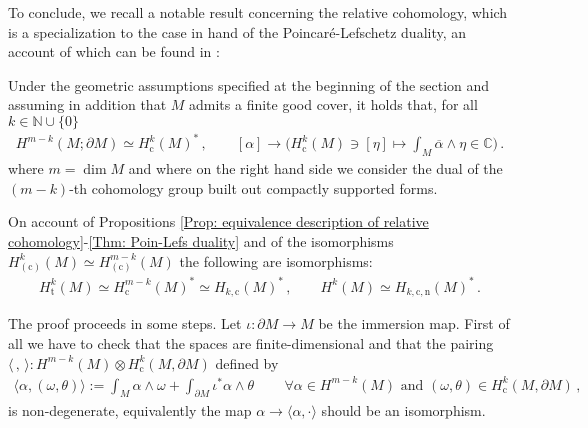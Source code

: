\noindent To conclude, we recall a notable result concerning the relative cohomology, which is a specialization to the case in hand of the Poincar\'e-Lefschetz duality, an account of which can be found in \cite{Maunder}:

\begin{theore}\label{Thm: Poin-Lefs duality}
	Under the geometric assumptions specified at the beginning of the section and assuming in addition that $M$ admits a finite good cover, it holds that, for all $k\in\mathbb{N}\cup\{0\}$
	\begin{align}
	H^{m-k}(M;\partial M)\simeq H^k_{\mathrm{c}}(M)^*\,,\qquad
	[\alpha]\to\bigg(H^k_{\mathrm{c}}(M)\ni[\eta]\mapsto\int_M\overline{\alpha}\wedge\eta\in\mathbb{C}\bigg)\,.
	\end{align}
	where $m=\dim M$ and where on the right hand side we consider the dual of the $(m-k)$-th cohomology group built out compactly supported forms.
\end{theore}

\begin{remar}\label{Rmk: consequence of Poincare--Lefschetz duality}
	On account of Propositions \ref{Prop: equivalence description of relative cohomology}-\ref{Thm: Poin-Lefs duality} and of the isomorphisms $H^k_{(\mathrm{c})}(M)\simeq H^{m-k}_{(\mathrm{c})}(M)$ the following are isomorphisms:
	\begin{align}\label{Eqn: relative cohomology isomorphic to dual of compactly supported differential homology }
	H^k_{\mathrm{t}}(M)\simeq
	H^{m-k}_{\mathrm{c}}(M)^*\simeq
	H_{k,\mathrm{c}}(M)^*\,,\qquad
	H^k(M)\simeq H_{k,\mathrm{c,n}}(M)^*\,.
	\end{align}
\end{remar}

The proof proceeds in some steps. Let $\iota:\partial M\to M$ be the immersion map. First of all we have to check that the spaces are finite-dimensional and that the pairing $\langle \,,\,\rangle:H^{m-k}(M)\otimes H_{\mathrm{c}}^{k}(M,\partial M)$ defined by
\begin{align}
\langle\alpha,(\omega,\theta)\rangle:=\int_M\alpha\wedge\omega+\int_{\partial M}\iota^*\alpha\wedge \theta\,\qquad\forall\alpha\in H^{m-k}(M)\text{ and } (\omega,\theta)\in H_{\mathrm{c}}^{k}(M,\partial M)\,,
\label{eq:dualitypair}
\end{align}
is non-degenerate, equivalently the map $\alpha\to\langle\alpha,\cdot\rangle$ should be an isomorphism.\\

